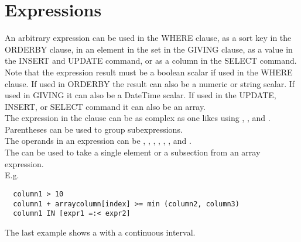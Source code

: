 \section{\label{TAQL:EXPRESSIONS}Expressions}
An arbitrary expression can be used in the WHERE clause, as a sort
key in the ORDERBY clause, in an element in the set in the GIVING
clause, as a value in the INSERT and UPDATE command, or as a column
in the SELECT command.
Note that the expression result must be
a boolean scalar if used in the WHERE clause. If used in ORDERBY
the result can also be a numeric or string scalar. If used in 
GIVING it can also be a DateTime scalar. If used in
the UPDATE, INSERT, or SELECT command it can also be an array.
\\The expression in the clause can be as complex as one likes
using
, 
, and .
Parentheses can be used to group subexpressions.
\\The operands in an expression can be
,
,
,
,
,
, and
.
\\The {} can be used to take a
single element or a subsection from an array expression.
\\E.g.
\begin{verbatim}
  column1 > 10
  column1 + arraycolumn[index] >= min (column2, column3)
  column1 IN [expr1 =:< expr2]
\end{verbatim}
The last example shows a  with a continuous interval.

